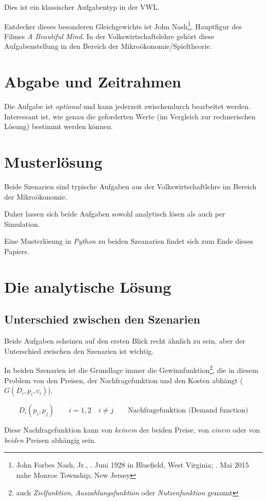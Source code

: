 \documentclass[paper=a4,notitlepage,parskip=half,plainheadsepline]{scrartcl}
\newif\ifloesung
\begin{document}
Dies ist ein klassischer Aufgabentyp in der VWL.

Entdecker dieses besonderen Gleichgewichts ist John Nash\footnote{John Forbes Nash, Jr., . Juni 1928 in Bluefield, West Virginia; . Mai 2015 nahe Monroe Township, New Jersey}, Hauptfigur des Filmes \emph{A Beautiful Mind}. In der Volkswirtschaftslehre gehört diese Aufgabenstellung in den Bereich der Mikroökonomie/Spieltheorie.

\section{Abgabe und Zeitrahmen}
Die Aufgabe ist \emph{optional} und kann jederzeit zwischendurch bearbeitet werden.
Interessant ist, wie genau die geforderten Werte (im Vergleich zur rechnerischen Lösung) bestimmt werden können.


\ifloesung
\newpage
\section{Musterlösung}
Beide Szenarien sind typische Aufgaben aus der Volkswirtschaftlehre im Bereich der Mikroökonomie.

Daher lassen sich beide Aufgaben sowohl analytisch lösen als auch per Simulation.

Eine Musterlösung in \emph{Python} zu beiden Szeanarien findet sich zum Ende dieses Papiers.

\section{Die analytische Lösung}
\subsection{Unterschied zwischen den Szenarien}
Beide Aufgaben scheinen auf den ersten Blick recht ähnlich zu sein, aber der Unterschied zwischen den Szenarien ist wichtig.

In beiden Szenarien ist die Grundlage immer die Gewinnfunktion\footnote{auch \emph{Zielfunktion}, \emph{Auszahlungsfunktion} 
oder \emph{Nutzenfunktion} genannt}, die in diesem Problem von den Preisen, der Nachfragefunktion und den Kosten abhängt ($G(D_i,p_i,c_i)$). 

$$D_i(p_i, p_j) \qquad i={1,2} \quad i\neq j \qquad \text{Nachfragefunktion (Demand function)} $$

Diese Nachfragefunktion kann von \emph{keinem} der beiden Preise, von \emph{einem} oder von \emph{beiden} Preisen abhängig sein.
\end{document}
